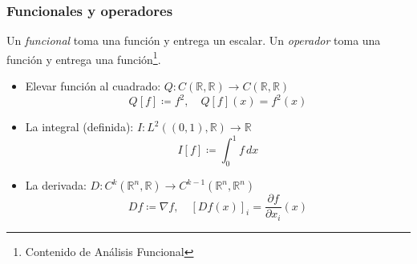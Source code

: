 \documentclass[12pt,aspectratio=169,xcolor=dvipsnames]{beamer}
\newcommand{\R}{\mathbb{R}}
\begin{document}
\begin{frame}\frametitle{Funcionales y operadores}
    Un \emph{funcional} toma una función y entrega un escalar. Un \emph{operador} toma una función y entrega una función\footnote{Contenido de Análisis Funcional}.  \pause

    \begin{itemize}
        \item<+-> Elevar función al cuadrado: $Q: C(\R, \R) \to C(\R, \R)$
            $$ Q[f] \coloneqq f^2, \quad Q[f](x) = f^2(x) $$
        \item<+-> La integral (definida): $I: L^2((0,1), \R) \to \R$
            $$ I[f] \coloneqq \int_0^1 f\,dx $$
        \item<+-> La derivada: $D: C^k(\R^n, \R) \to C^{k-1}(\R^n, \R^n)$
            $$ Df \coloneqq \nabla f, \quad [Df(x)]_i = \frac{\partial f}{\partial x_i}(x) $$
    \end{itemize}
\end{frame}
\begin{frame}
    \maketitle
\end{frame}
\end{document}
